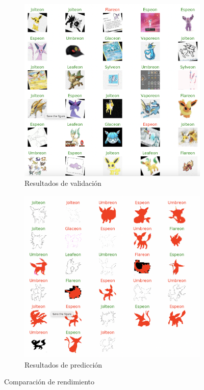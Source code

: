 \documentclass[transmag]{IEEEtran}
\begin{document}
\begin{figure}
	\begin{subfigure}{0.5\textwidth}
		\centering
		\includegraphics[width=0.8\linewidth]{finalcnnacc}
		\caption{Resultados de validación}
	\end{subfigure}
	\begin{subfigure}{0.5\textwidth}
		\centering
		\includegraphics[width=0.8\linewidth]{finalcnnpred}
		\caption{Resultados de predicción}
	\end{subfigure}
	\caption{Comparación de rendimiento}
	\label{fig:rend}
\end{figure}
\end{document}
